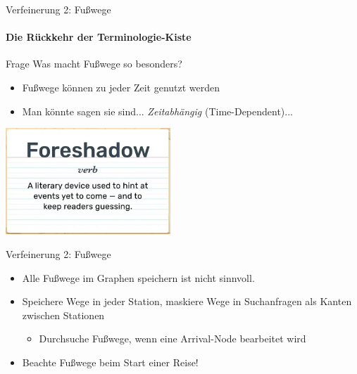 \begin{frame}{Verfeinerung 2: Fußwege}
	\framesubtitle{Die Rückkehr der Terminologie-Kiste}
	\begin{block}{Frage}
		Was macht Fußwege so besonders?
	\end{block}
	\begin{itemize}
		\item Fußwege können zu jeder Zeit genutzt werden
		\item Man könnte sagen sie sind... \textit{Zeitabhängig} (Time-Dependent)...
	\end{itemize}

	\begin{center}
		\includegraphics[height=4cm]{images/foreshadowing.png} 
	\end{center}
\end{frame}


\begin{frame}{Verfeinerung 2: Fußwege}
	\begin{itemize}
		\item Alle Fußwege im Graphen speichern ist nicht sinnvoll.
		\item Speichere Wege in jeder Station, maskiere Wege in Suchanfragen als Kanten zwischen Stationen
		\begin{itemize}
			\item Durchsuche Fußwege, wenn eine Arrival-Node bearbeitet wird 
		\end{itemize}
		\item Beachte Fußwege beim Start einer Reise!
	\end{itemize}
\end{frame}


